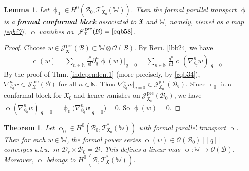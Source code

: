 \documentclass[11pt,b5paper,notitlepage]{article}
\theoremstyle{definition}
\theoremstyle{plain}
\newtheorem{thm}[df]{Theorem}
\newtheorem{lm}[df]{Lemma}
\newcommand{\mc}{\mathcal}
\newcommand{\scr}{\mathscr}
\newcommand{\Wbb}{\mathbb W}
\newcommand{\Nbb}{\mathbb N}
\newcommand{\<}{\left\langle}
\renewcommand{\>}{\right\rangle}
\newcommand{\MB}{\mathcal{B}}
\newcommand{\fx}{\mathfrak{X}}
\newcommand{\SJ}{\mathscr{J}}
\newcommand{\pre}{\mathrm{pre}}
\numberwithin{equation}{section}
\begin{document}
\begin{lm}\label{lbb25}
Let $\upphi_0\in H^0(\MB_0,\scr T_{\fx_0}^*(\Wbb))$. Then the formal parallel transport    $\upphi$ is a \textbf{formal conformal block}  associated to $\fx$ and $\Wbb$, namely, viewed as a map \eqref{eqb57}, $\upphi$ vanishes on $\SJ_\fx^\pre(\MB)=\eqref{eqb58}$.
\end{lm}


\begin{proof}
Choose $w\in \SJ_\fx^\pre(\MB)\subset \Wbb\otimes\mc O(\MB)$. By Rem. \ref{lbb24} we have
    \begin{align*}
        \upphi(w)=\sum_{n\in \Nbb}\frac{q^n}{n!}\partial_q^n \upphi(w)\big|_{q=0}=\sum_{n\in \Nbb}\frac{q^n}{n!}\upphi(\nabla_{\partial_q}^n w)\big|_{q=0} 
    \end{align*}
By the proof of Thm. \ref{independent1} (more precisely, by \eqref{eqb34}), $\nabla_{\partial_q}^n w\in \SJ_\fx^\pre(\MB)$ for all $n\in \Nbb$. Thus $\nabla^n_{\partial_q}w\big|_{q=0}\in\SJ_{\fx_0}^\pre(\MB_0)$. Since $\upphi_0$ is a conformal block for $\fx_0$ and hence vanishes on $\SJ_{\fx_0}^\pre(\MB_0)$, we have $\upphi(\nabla_{\partial_q}^n w)\big|_{q=0}=\upphi_0\big(\nabla_{\partial_q}^n w\big|_{q=0}\big)=0$. So $\upphi(w)=0$.
\end{proof}



\begin{thm}\label{lbb26}
Let $\upphi_0\in H^0(\MB_0,\scr T_{\fx_0}^*(\Wbb))$ with formal parallel transport $\upphi$. Then for each $w\in\Wbb$, the formal power series $\upphi(w)\in\mc O(\MB_0)[[q]]$ converges a.l.u. on $\mc D_r\times\MB_0=\MB$. This defines a linear map $\upphi:\Wbb\rightarrow\mc O(\MB)$. Moreover, $\upphi$ belongs to $H^0(\MB,\scr T_\fx^*(\Wbb))$.
\end{thm}
\end{document}
